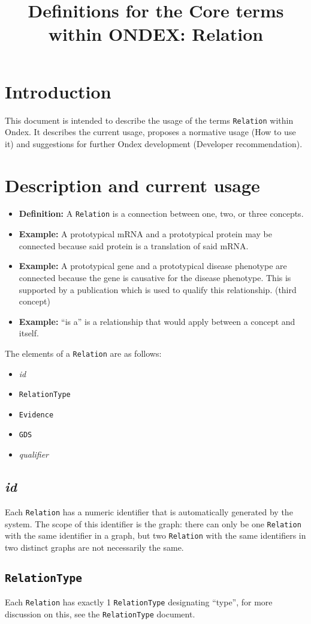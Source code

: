 \documentclass[a4paper,10pt]{article}
\title{Definitions for the Core terms within ONDEX: Relation}
\newcommand{\defn}[1]{\begin{itemize}\item\textbf{Definition: }#1\end{itemize}}
\newcommand{\example}[1]{\begin{itemize}\item\textbf{Example: }#1\xspace\end{itemize}}
\newcommand{\field}[1]{\textit{#1}\xspace}
\newcommand{\term}[1]{\texttt{#1}\xspace}
\newcommand{\rt}{\term{RelationType}}
\newcommand{\re}{\term{Relation}}
\begin{document}
\maketitle

\section{Introduction}

This document is intended to describe the usage of the terms \re within Ondex. It describes the current usage, proposes a normative usage (How to use it) and suggestions for further Ondex development (Developer recommendation). 


\section{Description and current usage}


\defn{A \re is a connection between one, two, or three concepts.}
\example{A prototypical mRNA and a prototypical protein may be connected because said protein is a translation of said mRNA.}
\example{A prototypical gene and a prototypical disease phenotype are connected because the gene is causative for the disease phenotype. This is supported by a publication which is used to qualify this relationship. (third concept)}
\example{``is a'' is a relationship that would apply between a concept and itself.}


The elements of a \re are as follows:
\begin{itemize}
\item \field{id}
\item \rt
\item \term{Evidence}
\item \term{GDS}
\item \field{qualifier}
\end{itemize}

\subsection{\field{id}}
Each \re has a numeric identifier that is automatically generated by the system. The scope of this identifier is the graph: there can only be one \re with the same identifier in a graph, but two \re with the same identifiers in two distinct graphs are not necessarily the same.

\subsection{\rt}
Each \re has exactly 1 \rt designating ``type'', for more discussion on this, see the \rt document.
\end{document}
